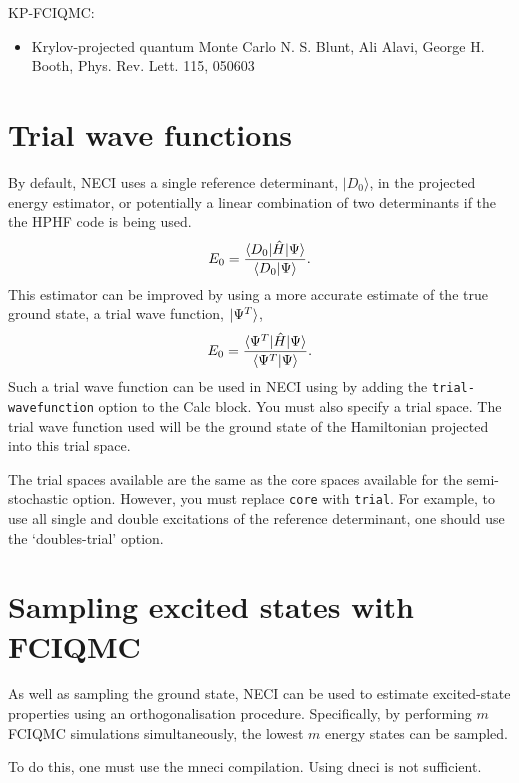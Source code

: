 \documentclass[a4paper,notitlepage,dvipsnames]{scrreprt}
\let\code\lstinline
\begin{document}
KP-FCIQMC:
\begin{itemize}
\item Krylov-projected quantum Monte Carlo
N. S. Blunt, Ali Alavi, George H. Booth, Phys. Rev. Lett. 115, 050603
\end{itemize}

    \section{Trial wave functions}
    \label{sec:trial}

    By default, NECI uses a single reference determinant, $|D_0\rangle$, in the
    projected energy estimator, or potentially a linear combination of two
    determinants if the the HPHF code is being used.
    \begin{equation}
        E_0 = \frac{\braket{D_0 | \hat{H} | \Psi}}{\braket{D_0 | \Psi}}.
    \end{equation}
    This estimator can be improved by using a more accurate estimate of the
    true ground state, a trial wave function, $\ket{\Psi^T}$,
    \begin{equation}
        E_0 = \frac{\braket{\Psi^T | \hat{H} | \Psi}}{\braket{\Psi^T | \Psi}}.
    \end{equation}
    Such a trial wave function can be used in NECI using by adding the
    \code{trial-wavefunction} option to the Calc block.
    You must also specify a
    trial space. The trial wave function used will be the ground state of the
    Hamiltonian projected into this trial space.

    The trial spaces available are the same as the core spaces available for
    the semi-stochastic option. However, you must replace \code{core} with
    \code{trial}. For
    example, to use all single and double excitations of the reference
    determinant, one should use the `doubles-trial' option.

\section{Sampling excited states with FCIQMC}

    As well as sampling the ground state, NECI can be used to estimate
    excited-state properties using an orthogonalisation procedure.
    Specifically, by performing $m$ FCIQMC simulations simultaneously,
    the lowest $m$ energy states can be sampled.

    To do this, one must use the mneci compilation. Using dneci is not
    sufficient.
\end{document}
